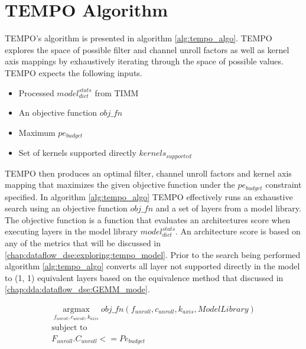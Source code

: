 \section{TEMPO Algorithm}
\label{chap:dataflow_dse:exploring:algorithm}


TEMPO's algorithm is presented in algorithm \ref{alg:tempo_algo}. TEMPO explores the
space of possible filter and channel unroll factors as well as kernel axis
mappings by exhaustively iterating through the space of possible values. TEMPO
expects the following inputs. 

\begin{itemize}
\item Processed $model^{stats}_{dict}$ from TIMM
\item An objective function $obj\_fn$
\item Maximum $pe_{budget}$ 
\item Set of kernels supported directly  $kernels_{supported}$ 
\end{itemize}

TEMPO then produces an optimal filter, channel unroll factors and kernel axis
mapping that maximizes the given objective function under the $pe_{budget}$
constraint specified. 
In algorithm \ref{alg:tempo_algo} TEMPO effectively runs an exhaustive search
using an objective function $obj\_fn$ and a set of layers from a model library.
The objective function is a function that evaluates an architectures score when
executing layers in the model library $model^{stats}_{dict}$. An architecture
score is based on any of the metrics that will be discussed in
\autoref{chap:dataflow_dse:exploring:tempo_model}. Prior to the search being
performed algorithm \ref{alg:tempo_algo} converts all layer not supported
directly in the model to (1, 1) equivalent layers based on the equivalence method
that discussed in \autoref{chap:dda:dataflow_dse:GEMM_mode}.

\begin{equation}
    \begin{aligned}
        \operatorname*{argmax}_{f_{unroll}, c_{unroll}, k_{axis}} obj\_fn(f_{unroll}, c_{unroll}, k_{axis}, ModelLibrary) \\
        \text{subject to} \\
        F_{unroll}. C_{unroll} <= Pe_{budget}
    \end{aligned}
    \label{math:tempo_algo_tldr}
\end{equation}

